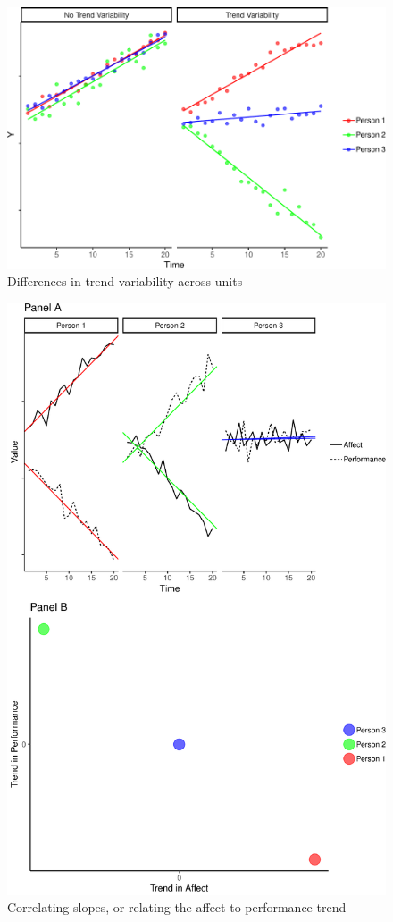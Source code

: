 \documentclass[english,,man]{apa6}
\theoremstyle{definition}
\theoremstyle{definition}
\theoremstyle{definition}
\theoremstyle{remark}
\begin{document}
\begin{figure}
\centering
\includegraphics{figures/unnamed-chunk-13-1.pdf}
\caption{\label{fig:unnamed-chunk-13}Differences in trend variability across
units\label{trend_var}}
\end{figure}

\begin{figure}
\centering
\includegraphics{figures/unnamed-chunk-14-1.pdf}
\caption{\label{fig:unnamed-chunk-14}Correlating slopes, or relating the
affect to performance trend\label{trend_correlation}}
\end{figure}
\end{document}
